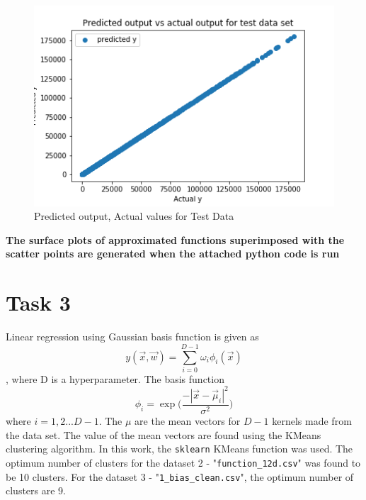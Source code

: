 \documentclass[12pt,a4paper]{article}
\newcommand{\noi}{\noindent}
\def\tt#1{\texttt{#1}}
\begin{document}
\begin{figure}[H]
     \centering
     \includegraphics[scale=0.7]{images/predtest.png}
     \caption{Predicted output, Actual values for Test Data}
     \label{fig:d6500}
\end{figure}

\noi
\textbf{The surface plots of approximated functions superimposed with the scatter points are generated when the attached python code is run}
 
\section{Task 3}
Linear regression using Gaussian basis function is given as 
\begin{equation}
    y(\vec{x},\vec{w}) = \sum_{i=0}^{D-1} \omega_{i}\phi_{i}(\vec{x})
\end{equation},
where D is a hyperparameter. The basis function 
\begin{equation}
    \phi_{i} = \exp\Big(\frac{-|\vec{x} - \vec{\mu}_i|^2}{\sigma^2}\Big)
\end{equation}
where $i = 1,2 ... D-1$. The $\mu$ are the mean vectors for $D-1$ kernels made from the data set. The value of the mean vectors are found using the KMeans clustering algorithm. In this work, the \tt{sklearn} KMeans function was used. The optimum number of clusters for the dataset 2 - "\texttt{function\_12d.csv}" was found to be 10 clusters. For the dataset 3 - "\tt{1\_bias\_clean.csv}", the optimum number of clusters are 9.
\end{document}
